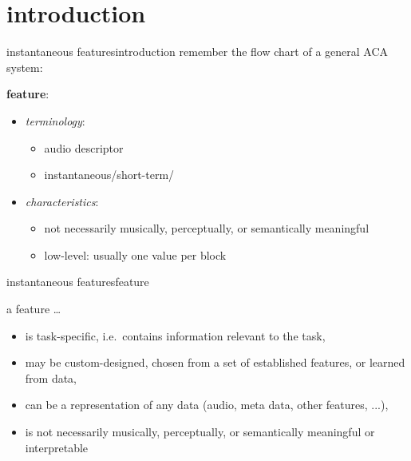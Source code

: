     \section[intro]{introduction}
        \begin{frame}{instantaneous features}{introduction}
            remember the flow chart of a general ACA system:
            \vspace{-3mm}
            \begin{figure}
                
            \end{figure}
            
            \vspace{-2mm}
            \pause
            \textbf{feature}:
            \begin{itemize}
                \item<2->   \textit{terminology}: 
                    \begin{itemize}
                        \item   audio descriptor
                        \item   instantaneous/short-term/
                    \end{itemize}
                \item<2->   \textit{characteristics}:
                    \begin{itemize}
                        \item	not necessarily musically, perceptually, or semantically meaningful
                        \item	low-level: usually one value per block
                    \end{itemize}
            \end{itemize}
        \end{frame}
        
        \begin{frame}{instantaneous features}{feature}
            \toremember{}
            \begin{block}{a feature \ldots}
            \begin{itemize}
                \item   is task-specific, i.e.\ contains information relevant to the task,
                \bigskip
                \item   may be custom-designed, chosen from a set of established features, or learned from data,
                \bigskip
                \item   can be a representation of any data (audio, meta data, other features, ...),
                \bigskip
                \item   is not necessarily musically, perceptually, or semantically meaningful or interpretable
            \end{itemize}
            \end{block}
        \end{frame}
        
